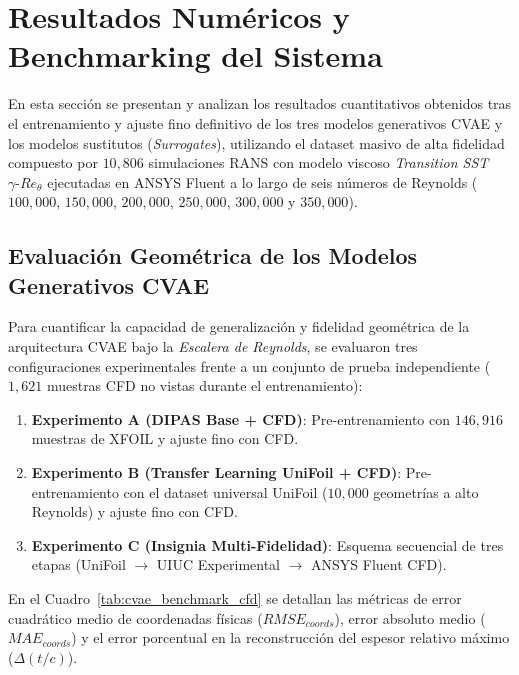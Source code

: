 \section{Resultados Numéricos y Benchmarking del Sistema}
\label{sec:resultados}

En esta sección se presentan y analizan los resultados cuantitativos obtenidos tras el entrenamiento y ajuste fino definitivo de los tres modelos generativos CVAE y los modelos sustitutos (\textit{Surrogates}), utilizando el dataset masivo de alta fidelidad compuesto por $10{,}806$ simulaciones RANS con modelo viscoso \textit{Transition SST} $\gamma\text{-}Re_\theta$ ejecutadas en ANSYS Fluent a lo largo de seis números de Reynolds ($100{,}000$, $150{,}000$, $200{,}000$, $250{,}000$, $300{,}000$ y $350{,}000$).

\subsection{Evaluación Geométrica de los Modelos Generativos CVAE}
Para cuantificar la capacidad de generalización y fidelidad geométrica de la arquitectura CVAE bajo la \textit{Escalera de Reynolds}, se evaluaron tres configuraciones experimentales frente a un conjunto de prueba independiente ($1{,}621$ muestras CFD no vistas durante el entrenamiento):
\begin{enumerate}
    \item \textbf{Experimento A (DIPAS Base + CFD)}: Pre-entrenamiento con $146{,}916$ muestras de XFOIL y ajuste fino con CFD.
    \item \textbf{Experimento B (Transfer Learning UniFoil + CFD)}: Pre-entrenamiento con el dataset universal UniFoil ($10{,}000$ geometrías a alto Reynolds) y ajuste fino con CFD.
    \item \textbf{Experimento C (Insignia Multi-Fidelidad)}: Esquema secuencial de tres etapas (UniFoil $\to$ UIUC Experimental $\to$ ANSYS Fluent CFD).
\end{enumerate}

En el Cuadro~\ref{tab:cvae_benchmark_cfd} se detallan las métricas de error cuadrático medio de coordenadas físicas ($RMSE_{coords}$), error absoluto medio ($MAE_{coords}$) y el error porcentual en la reconstrucción del espesor relativo máximo ($\Delta(t/c)$).

